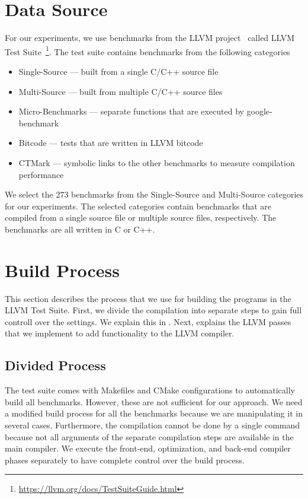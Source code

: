 \section{Data Source}
\label{sec:approach:dataset}
For our experiments, we use benchmarks from the LLVM project~\cite{LLVM:CGO04} called LLVM Test Suite~\footnote{\url{https://llvm.org/docs/TestSuiteGuide.html}}.
The test suite contains benchmarks from the following categories
\begin{itemize}
    \item Single-Source --- built from a single C/C++ source file
    \item Multi-Source --- built from multiple C/C++ source files
    \item Micro-Benchmarks --- separate functions that are executed by google-benchmark
    \item Bitcode --- tests that are written in LLVM bitcode
    \item CTMark --- symbolic links to the other benchmarks to measure compilation performance
\end{itemize}
We select the 273 benchmarks from the Single-Source and Multi-Source categories for our experiments.
The selected categories contain benchmarks that are compiled from a single source file or multiple source files, respectively.
The benchmarks are all written in C or C++.

\section{Build Process}
\label{sec:approach:build_process}
This section describes the process that we use for building the programs in the LLVM Test Suite.
First, we divide the compilation into separate steps to gain full controll over the settings.
We explain this in .
Next,  explains the LLVM passes that we implement to add functionality to the LLVM compiler.

\subsection{Divided Process}
\label{sec:approach:divided-build}
The test suite comes with Makefiles and CMake configurations to automatically build all benchmarks.
However, these are not sufficient for our approach.
We need a modified build process for all the benchmarks because we are manipulating it in several cases.
Furthermore, the compilation cannot be done by a single command because not all arguments of the separate compilation steps are available in the main compiler.
We execute the front-end, optimization, and back-end compiler phases separately to have complete control over the build process.

